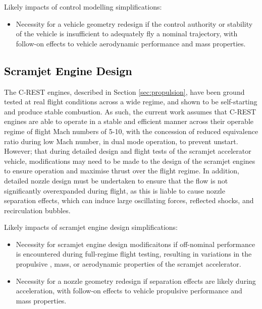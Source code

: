 Likely impacts of control modelling simplifications:
\begin{itemize}[noitemsep,topsep=0pt]
	\item Necessity for a vehicle geometry redesign if the control authority or stability of the vehicle is insufficient to adequately fly a nominal trajectory, with follow-on effects to vehicle aerodynamic performance and mass properties.
\end{itemize}
	\textcolor{black}{
		\subsection{Scramjet Engine Design}
	}
	\noindent	
	The C-REST engines, described in Section \ref{sec:propulsion}, have been ground tested at real flight conditions across a wide regime, and shown to be self-starting and produce stable combustion\cite{Smart2012,Whitside,Turner,Barth,Curran}. As such, the current work assumes that C-REST engines are able to operate in a stable and efficient manner across their operable regime of flight Mach numbers of 5-10, with the concession of reduced equivalence ratio during low Mach number, in dual mode operation, to prevent unstart. 
	 However; that during detailed design and flight tests of the scramjet accelerator vehicle, modifications may need to be made to the design of the scramjet engines to ensure operation and maximise thrust over the flight regime. In addition, detailed nozzle design must be undertaken to ensure that the flow is not significantly overexpanded during flight, as this is liable to cause nozzle separation effects, which can induce large oscillating forces, reflected shocks, and recirculation bubbles\cite{Hadjaj2009}. 
	 
	Likely impacts of scramjet engine design simplifications:
	\begin{itemize}[noitemsep,topsep=0pt]
		\item Necessity for scramjet engine design modificaitons if off-nominal performance is encountered during full-regime flight testing, resulting in variations in the propulsive , mass, or aerodynamic properties of the scramjet accelerator. 
		\item Necessity for a nozzle geometry redesign if separation effects are likely during acceleration, with follow-on effects to vehicle propulsive performance and mass properties.
	\end{itemize}

